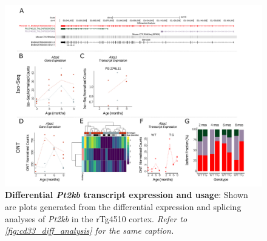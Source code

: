 \begin{landscape}
	\begin{figure}[htp]
		\begin{center}
			\includegraphics[page=13,trim={0 0.5cm 0 1.5cm},scale =0.85]{Figures/TargetGene_DifferentialAnalysis.pdf}
		\end{center}
		\captionsetup{width=1.5\textwidth}
		\caption[Differential \textit{Pt2kb} transcript expression and usage]%
		{\textbf{Differential \textit{Pt2kb} transcript expression and usage}: Shown are plots generated from the differential expression and splicing analyses of \textit{Pt2kb} in the rTg4510 cortex. \textit{Refer to \cref{fig:cd33_diff_analysis} for the same caption.}}   
		\label{fig:Ptk2b_diff_analysis}
	\end{figure}
\end{landscape}

